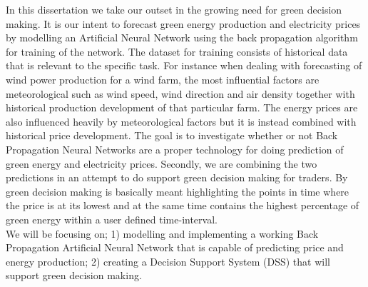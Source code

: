 In this dissertation we take our outset in the growing need for green decision making. It is our intent to forecast green energy production and electricity prices by modelling an Artificial Neural Network using the back propagation algorithm for training of the network. The dataset for training consists of historical data that is relevant to the specific task. For instance when dealing with forecasting of wind power production for a wind farm, the most influential factors are meteorological such as wind speed, wind direction and air density together with historical production development of that particular farm. The energy prices are also influenced heavily by meteorological factors but it is instead combined with historical price development.
The goal is to investigate whether or not Back Propagation Neural Networks are a proper technology for doing prediction of green energy and electricity prices. Secondly, we are combining the two predictions in an attempt to do support green decision making for traders. By green decision making is basically meant highlighting the points in time where the price is at its lowest and at the same time contains the highest percentage of green energy within a user defined time-interval.
\\[0.5cm]
We will be focusing on; 1) modelling and implementing a working Back Propagation Artificial Neural Network that is capable of predicting price and energy production; 2) creating a Decision Support System (DSS) that will support green decision making.